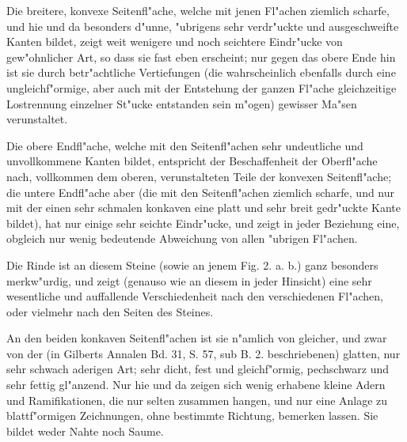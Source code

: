 \documentclass[a4paper, 11pt, oneside, german]{article}
\begin{document}
Die breitere, konvexe Seitenfl"ache, welche mit jenen Fl"achen ziemlich scharfe, und hie und da besonders d"unne, "ubrigens sehr verdr"uckte und ausgeschweifte Kanten bildet, zeigt weit wenigere und noch seichtere Eindr"ucke von gew"ohnlicher Art, so dass sie fast eben erscheint; nur gegen das obere Ende hin ist sie durch betr"achtliche Vertiefungen (die wahrscheinlich ebenfalls durch eine ungleichf"ormige, aber auch mit der Entstehung der ganzen Fl"ache gleichzeitige Lostrennung einzelner St"ucke entstanden sein m"ogen) gewisser Ma"sen verunstaltet.

Die obere Endfl"ache, welche mit den Seitenfl"achen sehr undeutliche und unvollkommene Kanten bildet, entspricht der Beschaffenheit der Oberfl"ache nach, vollkommen dem oberen, verunstalteten Teile der konvexen Seitenfl"ache; die untere Endfl"ache aber (die mit den Seitenfl"achen ziemlich scharfe, und nur mit der einen sehr schmalen konkaven eine platt und sehr breit gedr"uckte Kante bildet), hat nur einige sehr seichte Eindr"ucke, und zeigt in jeder Beziehung eine, obgleich nur wenig bedeutende Abweichung von allen "ubrigen Fl"achen.

Die Rinde ist an diesem Steine (sowie an jenem Fig. 2. a. b.) ganz besonders merkw"urdig, und zeigt (genauso wie an diesem in jeder Hinsicht) eine sehr wesentliche und auffallende Verschiedenheit nach den verschiedenen Fl"achen, oder vielmehr nach den Seiten des Steines.

An den beiden konkaven Seitenfl"achen ist sie n"amlich von gleicher, und zwar von der (in Gilberts Annalen Bd. 31, S. 57, sub B. 2. beschriebenen) glatten, nur sehr schwach aderigen Art; sehr dicht, fest und gleichf"ormig, pechschwarz und sehr fettig gl"anzend. Nur hie und da zeigen sich wenig erhabene kleine Adern und Ramifikationen, die nur selten zusammen hangen, und nur eine Anlage zu blattf"ormigen Zeichnungen, ohne bestimmte Richtung, bemerken lassen. Sie bildet weder Nahte noch Saume.
\end{document}
